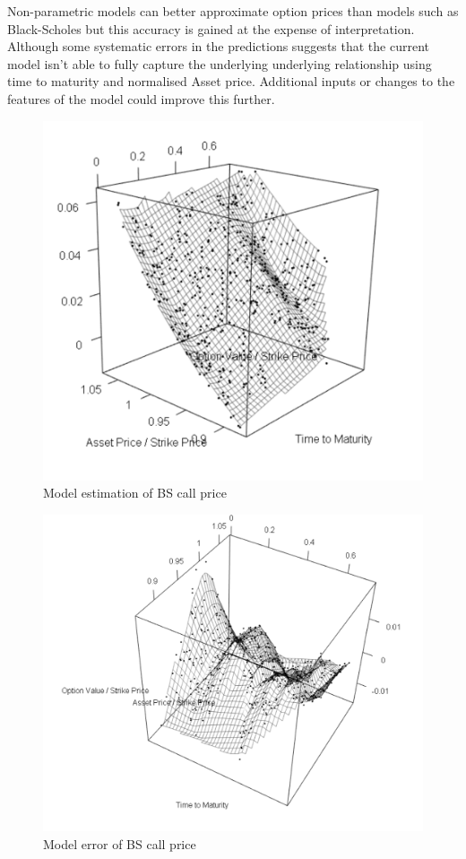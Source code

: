 \documentclass{sig-alternate-05-2015}
\begin{document}
Non-parametric models can better approximate option prices than models such as Black-Scholes but this accuracy is gained at the expense of interpretation. Although some systematic errors in the predictions suggests that the current model isn't able to fully capture the underlying underlying relationship using time to maturity and normalised Asset price. Additional inputs or changes to the features of the model could improve this further. 



\newpage

\begin{figure}[p]
	\includegraphics[width=0.7\linewidth]{BS_est.png}
	\centering
	\caption{Model estimation of BS call price}
			\label{fig:BS_est}
\end{figure} 


\begin{figure}[p]
	\includegraphics[width=0.7\linewidth]{BS_err.png}
	\centering
	\caption{Model error of BS call price}
			\label{fig:BS_err}
\end{figure} 
\end{document}
